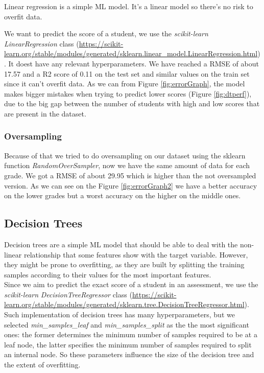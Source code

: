 \documentclass{article}
\begin{document}
Linear regression is a simple ML model. It's a linear model so there's no risk to overfit data.

We want to predict the score of a student, we use the \textit{scikit-learn LinearRegression} class (\url{https://scikit-learn.org/stable/modules/generated/sklearn.linear_model.LinearRegression.html}). It doest have any relevant hyperparameters.
We have reached a RMSE of about 17.57 and a R2 score of 0.11 on the test set and similar values on the train set since it can't overfit data.
As we can from Figure \ref{fig:errorGraph}, the model makes bigger mistakes when trying to predict lower scores (Figure \ref{fig:dtperf}), due to the big gap between the number of students with high and low scores that are present in the dataset. 

\subsubsection{Oversampling}
Because of that we tried to do oversampling on our dataset using the sklearn function \textit{RandomOverSampler}, now we have the same amount of data for each grade. 
We got a RMSE of about 29.95 which is higher than the not oversampled version. As we can see on the Figure \ref{fig:errorGraph2} we have a better accuracy on the lower grades but a worst accuracy on the higher on the middle ones.






\FloatBarrier

\subsection{Decision Trees}

Decision trees are a simple ML model that should be able to deal with the non-linear relationship that some features show with the target variable. However, they might be prone to overfitting, as they are built by splitting the training samples according to their values for the most important features.\\

Since we aim to predict the exact score of a student in an assessment, we use the \textit{scikit-learn} \textit{DecisionTreeRegressor} class (\url{https://scikit-learn.org/stable/modules/generated/sklearn.tree.DecisionTreeRegressor.html}). Such implementation of decision trees has many hyperparameters, but we selected \textit{min\_samples\_leaf} and \textit{min\_samples\_split} as the the most significant ones: the former determines the minimum number of samples required to be at a leaf node, the latter specifies the minimum number of samples required to split an internal node. So these parameters influence the size of the decision tree and the extent of overfitting.\\
\end{document}
